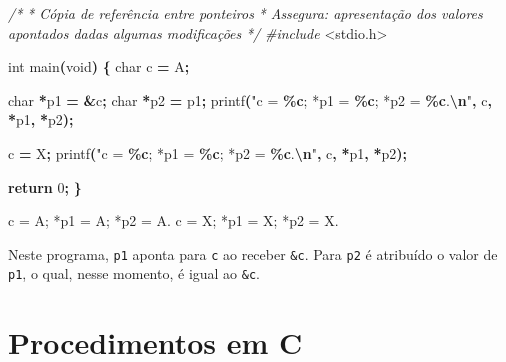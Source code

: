 \documentclass[
  11pt,
  a4paper,
]{scrbook}
\newenvironment{Shaded}{\begin{snugshade}}{\end{snugshade}}
\newcommand{\CharTok}[1]{\textcolor[rgb]{0.31,0.60,0.02}{#1}}
\newcommand{\CommentTok}[1]{\textcolor[rgb]{0.56,0.35,0.01}{\textit{#1}}}
\newcommand{\ControlFlowTok}[1]{\textcolor[rgb]{0.13,0.29,0.53}{\textbf{#1}}}
\newcommand{\DataTypeTok}[1]{\textcolor[rgb]{0.13,0.29,0.53}{#1}}
\newcommand{\DecValTok}[1]{\textcolor[rgb]{0.00,0.00,0.81}{#1}}
\newcommand{\ImportTok}[1]{#1}
\newcommand{\NormalTok}[1]{#1}
\newcommand{\OperatorTok}[1]{\textcolor[rgb]{0.81,0.36,0.00}{\textbf{#1}}}
\newcommand{\PreprocessorTok}[1]{\textcolor[rgb]{0.56,0.35,0.01}{\textit{#1}}}
\newcommand{\SpecialCharTok}[1]{\textcolor[rgb]{0.81,0.36,0.00}{\textbf{#1}}}
\newcommand{\StringTok}[1]{\textcolor[rgb]{0.31,0.60,0.02}{#1}}
\begin{document}
\begin{Shaded}
\begin{Highlighting}[]
\CommentTok{/*}
\CommentTok{ * Cópia de referência entre ponteiros}
\CommentTok{ * Assegura: apresentação dos valores apontados dadas algumas modificações}
\CommentTok{ */}
\PreprocessorTok{\#include }\ImportTok{\textless{}stdio.h\textgreater{}}

\DataTypeTok{int}\NormalTok{ main}\OperatorTok{(}\DataTypeTok{void}\OperatorTok{)} \OperatorTok{\{}
    \DataTypeTok{char}\NormalTok{ c }\OperatorTok{=} \CharTok{\textquotesingle{}A\textquotesingle{}}\OperatorTok{;}

    \DataTypeTok{char} \OperatorTok{*}\NormalTok{p1 }\OperatorTok{=} \OperatorTok{\&}\NormalTok{c}\OperatorTok{;}
    \DataTypeTok{char} \OperatorTok{*}\NormalTok{p2 }\OperatorTok{=}\NormalTok{ p1}\OperatorTok{;}
\NormalTok{    printf}\OperatorTok{(}\StringTok{"c = }\SpecialCharTok{\%c}\StringTok{; *p1 = }\SpecialCharTok{\%c}\StringTok{; *p2 = }\SpecialCharTok{\%c}\StringTok{.}\SpecialCharTok{\textbackslash{}n}\StringTok{"}\OperatorTok{,}\NormalTok{ c}\OperatorTok{,} \OperatorTok{*}\NormalTok{p1}\OperatorTok{,} \OperatorTok{*}\NormalTok{p2}\OperatorTok{);}

\NormalTok{    c }\OperatorTok{=} \CharTok{\textquotesingle{}X\textquotesingle{}}\OperatorTok{;}
\NormalTok{    printf}\OperatorTok{(}\StringTok{"c = }\SpecialCharTok{\%c}\StringTok{; *p1 = }\SpecialCharTok{\%c}\StringTok{; *p2 = }\SpecialCharTok{\%c}\StringTok{.}\SpecialCharTok{\textbackslash{}n}\StringTok{"}\OperatorTok{,}\NormalTok{ c}\OperatorTok{,} \OperatorTok{*}\NormalTok{p1}\OperatorTok{,} \OperatorTok{*}\NormalTok{p2}\OperatorTok{);}

    \ControlFlowTok{return} \DecValTok{0}\OperatorTok{;}
\OperatorTok{\}}
\end{Highlighting}
\end{Shaded}

\begin{Shaded}
\begin{Highlighting}[]
\NormalTok{c = A; *p1 = A; *p2 = A.}
\NormalTok{c = X; *p1 = X; *p2 = X.}
\end{Highlighting}
\end{Shaded}

Neste programa, \texttt{p1} aponta para \texttt{c} ao receber
\texttt{\&c}. Para \texttt{p2} é atribuído o valor de \texttt{p1}, o
qual, nesse momento, é igual ao \texttt{\&c}.

\chapter{Procedimentos em C}\label{sec-procedimentos}
\end{document}
